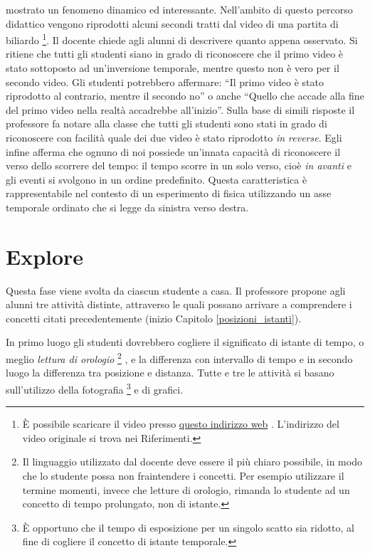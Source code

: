 \documentclass{report} \usepackage[T1]{fontenc} \usepackage[italian]{babel}
\begin{document}
mostrato un fenomeno dinamico ed interessante.
Nell'ambito di questo percorso didattico
vengono riprodotti alcuni secondi tratti dal video di una partita di biliardo
\footnote{
          \`E possibile scaricare il video presso
          \textcolor{blue}{\href{https://github.com/savaroskij/PED1/blob/master/progetto_finale/media/video/pool.mp4?raw=true}{questo indirizzo web}}
          . L'indirizzo del video originale si trova nei Riferimenti\cite{pool}.
}.
Il docente chiede agli alunni di descrivere quanto appena osservato.
Si ritiene che tutti gli studenti siano in grado di riconoscere
che il primo video è stato sottoposto ad un'inversione temporale,
mentre questo non è vero per il secondo video.
Gli studenti potrebbero affermare: ``Il primo video è stato riprodotto al contrario,
mentre il secondo no'' o anche ``Quello che accade alla fine del primo video
nella realtà accadrebbe all’inizio''. Sulla base di simili risposte il professore
fa notare alla classe che tutti gli studenti sono stati in grado di riconoscere con
facilità quale dei due video è stato riprodotto \emph{in reverse}.
Egli infine afferma che ognuno di noi possiede un'innata capacità di
riconoscere il verso dello scorrere del tempo:
il tempo scorre in un solo verso, cioè \emph{in avanti} e gli eventi si svolgono
in un ordine predefinito. Questa
caratteristica è rappresentabile nel contesto di un esperimento di fisica
utilizzando un asse temporale ordinato che si legge da sinistra verso destra.

\section{Explore}
Questa fase viene svolta da ciascun studente a casa. Il professore propone agli
alunni tre attività distinte, attraverso le quali possano arrivare a
comprendere i concetti citati precedentemente (inizio Capitolo \ref{posizioni_istanti}).

In primo luogo gli
studenti dovrebbero cogliere il significato di istante di tempo, o meglio
\emph{lettura di orologio}\cite{arons1997teaching}
\footnote{
           Il linguaggio utilizzato dal docente deve essere il più chiaro possibile, in modo
           che lo studente possa non fraintendere i concetti. Per esempio utilizzare il
           termine momenti, invece che letture di orologio, rimanda lo studente ad un
           concetto di tempo prolungato, non di istante.
         }
, e la differenza con intervallo
di tempo e in secondo luogo la differenza tra posizione e distanza.
Tutte e tre le attività si basano sull’utilizzo della fotografia
\footnote{
          \`E opportuno che il tempo di esposizione per un singolo scatto sia ridotto, al
            fine di cogliere il concetto di istante temporale.
         }
e di grafici.
\end{document}
